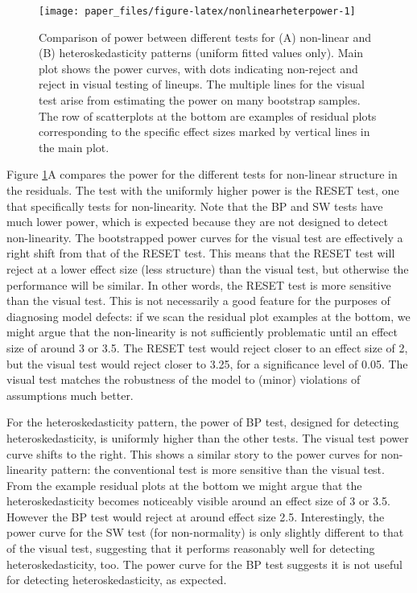 \documentclass[]{interact}
\theoremstyle{plain}%
\theoremstyle{definition}
\theoremstyle{remark}
\begin{document}
\begin{figure}

{\centering \texttt{[image: paper\_files/figure-latex/nonlinearheterpower-1]} 

}

\caption{Comparison of power between different tests for (A) non-linear and (B) heteroskedasticity patterns (uniform fitted values only). Main plot shows the power curves, with dots indicating non-reject and reject in visual testing of lineups. The multiple lines for the visual test arise from estimating the power on many bootstrap samples. The row of scatterplots at the bottom are examples of residual plots corresponding to the specific effect sizes marked by vertical lines in the main plot.}\label{fig:nonlinearheterpower}
\end{figure}

Figure \ref{fig:nonlinearheterpower}A compares the power for the
different tests for non-linear structure in the residuals. The test with
the uniformly higher power is the RESET test, one that specifically
tests for non-linearity. Note that the BP and SW tests have much lower
power, which is expected because they are not designed to detect
non-linearity. The bootstrapped power curves for the visual test are
effectively a right shift from that of the RESET test. This means that
the RESET test will reject at a lower effect size (less structure) than
the visual test, but otherwise the performance will be similar. In other
words, the RESET test is more sensitive than the visual test. This is
not necessarily a good feature for the purposes of diagnosing model
defects: if we scan the residual plot examples at the bottom, we might
argue that the non-linearity is not sufficiently problematic until an
effect size of around 3 or 3.5. The RESET test would reject closer to an
effect size of 2, but the visual test would reject closer to 3.25, for a
significance level of 0.05. The visual test matches the robustness of
the model to (minor) violations of assumptions much better.

For the heteroskedasticity pattern, the power of BP test, designed for
detecting heteroskedasticity, is uniformly higher than the other tests.
The visual test power curve shifts to the right. This shows a similar
story to the power curves for non-linearity pattern: the conventional
test is more sensitive than the visual test. From the example residual
plots at the bottom we might argue that the heteroskedasticity becomes
noticeably visible around an effect size of 3 or 3.5. However the BP
test would reject at around effect size 2.5. Interestingly, the power
curve for the SW test (for non-normality) is only slightly different to
that of the visual test, suggesting that it performs reasonably well for
detecting heteroskedasticity, too. The power curve for the BP test
suggests it is not useful for detecting heteroskedasticity, as expected.
\end{document}
